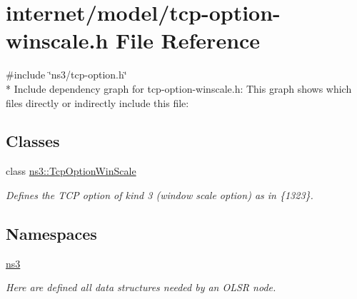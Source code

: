 \hypertarget{tcp-option-winscale_8h}{}\section{internet/model/tcp-\/option-\/winscale.h File Reference}
\label{tcp-option-winscale_8h}
{\ttfamily \#include \char`\"{}ns3/tcp-\/option.\+h\char`\"{}}\\*
Include dependency graph for tcp-\/option-\/winscale.h\+:
This graph shows which files directly or indirectly include this file\+:
\subsection*{Classes}
\begin{DoxyCompactItemize}
\item 
class \hyperlink{classns3_1_1TcpOptionWinScale}{ns3\+::\+Tcp\+Option\+Win\+Scale}
\begin{DoxyCompactList}\small\item\em Defines the T\+CP option of kind 3 (window scale option) as in \{1323\}. \end{DoxyCompactList}\end{DoxyCompactItemize}
\subsection*{Namespaces}
\begin{DoxyCompactItemize}
\item 
 \hyperlink{namespacens3}{ns3}
\begin{DoxyCompactList}\small\item\em Here are defined all data structures needed by an O\+L\+SR node. \end{DoxyCompactList}\end{DoxyCompactItemize}
